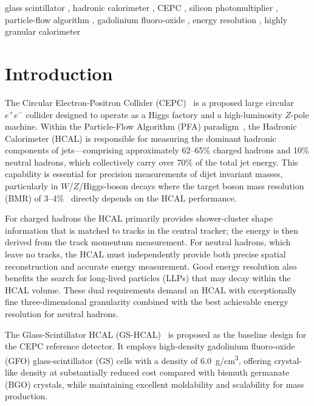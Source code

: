 \documentclass[preprint,12pt,times]{elsarticle}
\begin{document}
\begin{frontmatter}
\begin{keyword}
glass scintillator \sep
hadronic calorimeter \sep
CEPC \sep
silicon photomultiplier \sep
particle-flow algorithm \sep
gadolinium fluoro-oxide \sep
energy resolution \sep
highly granular calorimeter
\end{keyword}

\end{frontmatter}

\linenumbers

\section{Introduction}
\label{sec:intro}

The Circular Electron-Positron Collider
(CEPC)~\cite{CEPCStudyGroup:2018ghi} is a proposed large circular
$e^{+}e^{-}$ collider designed to operate as a Higgs factory and a
high-luminosity $Z$-pole machine.
Within the Particle-Flow Algorithm (PFA)
paradigm~\cite{Thomson:2009rp,Brient:2004yq,Ruan:2013rkk}, the
Hadronic Calorimeter (HCAL) is responsible for measuring the dominant
hadronic components of jets---comprising approximately 62--65\% charged
hadrons and 10\% neutral hadrons, which collectively carry over 70\% of
the total jet energy.
This capability is essential for precision measurements of dijet
invariant masses, particularly in $W$/$Z$/Higgs-boson decays where the
target boson mass resolution (BMR) of
3--4\%~\cite{CEPCStudyGroup:2018ghi} directly depends on the HCAL
performance.

For charged hadrons the HCAL primarily provides shower-cluster shape
information that is matched to tracks in the central tracker; the
energy is then derived from the track momentum measurement.
For neutral hadrons, which leave no tracks, the HCAL must independently
provide both precise spatial reconstruction and accurate energy
measurement.
Good energy resolution also benefits the search for long-lived particles
(LLPs) that may decay within the HCAL volume.
These dual requirements demand an HCAL with exceptionally fine
three-dimensional granularity combined with the best achievable energy
resolution for neutral hadrons.

The Glass-Scintillator HCAL
(GS-HCAL)~\cite{Tang:2022yrb,Hu:2023dbm,Hu:2024nvo} is proposed as the
baseline design for the CEPC reference detector.
It employs high-density gadolinium fluoro-oxide (GFO) glass-scintillator
(GS) cells with a density of \SI{6.0}{g/cm^{3}}, offering crystal-like
density at substantially reduced cost compared with bismuth germanate
(BGO) crystals, while maintaining excellent moldability and scalability
for mass production.
\end{document}
